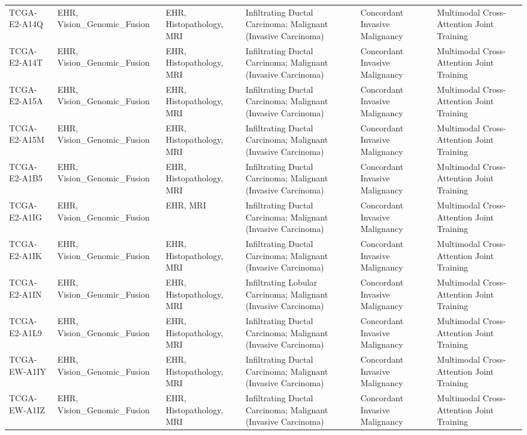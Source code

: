 \begin{table}
\begin{tabular}{llllll}
TCGA-E2-A14Q & EHR, Vision\_Genomic\_Fusion & EHR, Histopathology, MRI & Infiltrating Ductal Carcinoma; Malignant (Invasive Carcinoma) & Concordant Invasive Malignancy & Multimodal Cross-Attention Joint Training \\
TCGA-E2-A14T & EHR, Vision\_Genomic\_Fusion & EHR, Histopathology, MRI & Infiltrating Ductal Carcinoma; Malignant (Invasive Carcinoma) & Concordant Invasive Malignancy & Multimodal Cross-Attention Joint Training \\
TCGA-E2-A15A & EHR, Vision\_Genomic\_Fusion & EHR, Histopathology, MRI & Infiltrating Ductal Carcinoma; Malignant (Invasive Carcinoma) & Concordant Invasive Malignancy & Multimodal Cross-Attention Joint Training \\
TCGA-E2-A15M & EHR, Vision\_Genomic\_Fusion & EHR, Histopathology, MRI & Infiltrating Ductal Carcinoma; Malignant (Invasive Carcinoma) & Concordant Invasive Malignancy & Multimodal Cross-Attention Joint Training \\
TCGA-E2-A1B5 & EHR, Vision\_Genomic\_Fusion & EHR, Histopathology, MRI & Infiltrating Ductal Carcinoma; Malignant (Invasive Carcinoma) & Concordant Invasive Malignancy & Multimodal Cross-Attention Joint Training \\
TCGA-E2-A1IG & EHR, Vision\_Genomic\_Fusion & EHR, MRI & Infiltrating Ductal Carcinoma; Malignant (Invasive Carcinoma) & Concordant Invasive Malignancy & Multimodal Cross-Attention Joint Training \\
TCGA-E2-A1IK & EHR, Vision\_Genomic\_Fusion & EHR, Histopathology, MRI & Infiltrating Ductal Carcinoma; Malignant (Invasive Carcinoma) & Concordant Invasive Malignancy & Multimodal Cross-Attention Joint Training \\
TCGA-E2-A1IN & EHR, Vision\_Genomic\_Fusion & EHR, Histopathology, MRI & Infiltrating Lobular Carcinoma; Malignant (Invasive Carcinoma) & Concordant Invasive Malignancy & Multimodal Cross-Attention Joint Training \\
TCGA-E2-A1L9 & EHR, Vision\_Genomic\_Fusion & EHR, Histopathology, MRI & Infiltrating Ductal Carcinoma; Malignant (Invasive Carcinoma) & Concordant Invasive Malignancy & Multimodal Cross-Attention Joint Training \\
TCGA-EW-A1IY & EHR, Vision\_Genomic\_Fusion & EHR, Histopathology, MRI & Infiltrating Ductal Carcinoma; Malignant (Invasive Carcinoma) & Concordant Invasive Malignancy & Multimodal Cross-Attention Joint Training \\
TCGA-EW-A1IZ & EHR, Vision\_Genomic\_Fusion & EHR, Histopathology, MRI & Infiltrating Ductal Carcinoma; Malignant (Invasive Carcinoma) & Concordant Invasive Malignancy & Multimodal Cross-Attention Joint Training \\

\end{tabular}
\end{table}
